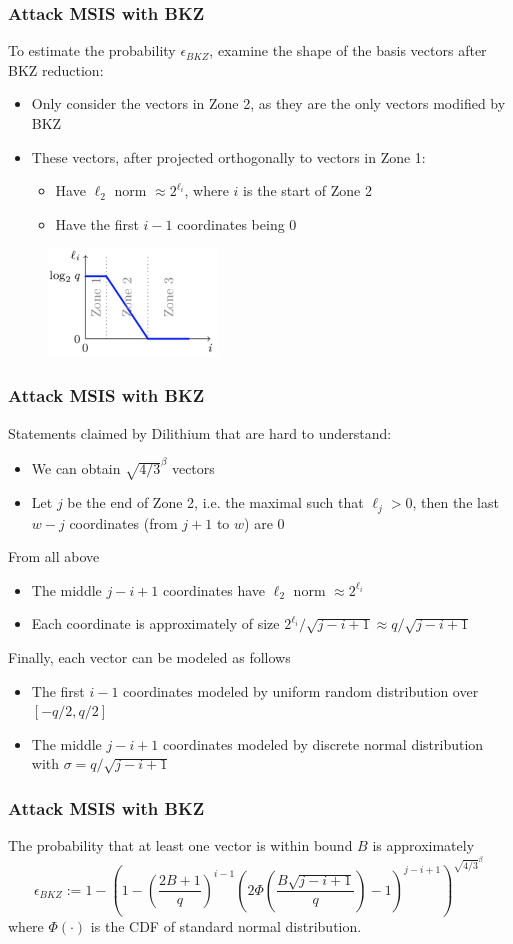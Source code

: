 \documentclass{beamer}
\begin{document}
\frame
{
  \frametitle{Attack MSIS with BKZ}
  To estimate the probability $\epsilon_{BKZ}$, examine the shape of the basis vectors after BKZ reduction:
  \begin{itemize}
    \item Only consider the vectors in Zone 2, as they are the only vectors modified by BKZ
    \item These vectors, after projected orthogonally to vectors in Zone 1:
    \begin{itemize}
      \item Have $\ell_2$ norm $\approx 2^{\ell_i}$, where $i$ is the start of Zone 2
      \item Have the first $i-1$ coordinates being $0$
    \end{itemize}
  \end{itemize}
  \begin{figure}[ht!]
  \includegraphics[width=0.4\textwidth]{files/after-reduction.png}
  \end{figure}
}

\frame
{
  \frametitle{Attack MSIS with BKZ}
  Statements claimed by Dilithium that are \alert{hard to understand}:
  \begin{itemize}
    \item We can obtain $\sqrt{4/3}^{\beta}$ vectors
    \item Let $j$ be the end of Zone 2, i.e. the maximal such that $\ell_j>0$, then the last $w-j$ coordinates (from $j+1$ to $w$) are $0$
  \end{itemize}
  From all above
  \begin{itemize}
    \item The middle $j-i+1$ coordinates have $\ell_2$ norm $\approx 2^{\ell_i}$
    \item Each coordinate is approximately of size $2^{\ell_i}/\sqrt{j-i+1}\approx q/\sqrt{j-i+1}$
  \end{itemize}
  Finally, each vector can be modeled as follows
  \begin{itemize}
    \item The first $i-1$ coordinates modeled by uniform random distribution over $[-q/2, q/2]$
    \item The middle $j-i+1$ coordinates modeled by discrete normal distribution with $\sigma=q/\sqrt{j-i+1}$
  \end{itemize}
}

\frame
{
  \frametitle{Attack MSIS with BKZ}
  The probability that at least one vector is within bound $B$ is approximately
  \[
  	 \epsilon_{BKZ}:=1-\left(1-\left(\frac{2B+1}{q}\right)^{i-1}\left(2\Phi\left(\frac{B\sqrt{j-i+1}}{q}\right)-1\right)^{j-i+1}\right)^{\sqrt{4/3}^{\beta}}\,
  \]
  where $\Phi(\cdot)$ is the CDF of standard normal distribution.
}

\end{document}
